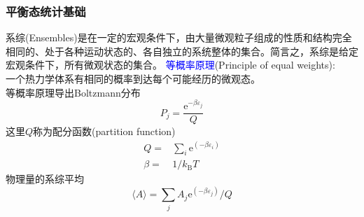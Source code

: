 {\frame
{
	\frametitle{平衡态统计基础}
	系综(\textrm{Ensembles})是在一定的宏观条件下，由大量微观粒子组成的性质和结构完全相同的、处于各种运动状态的、各自独立的系统整体的集合。简言之，系综是给定宏观条件下，所有微观状态的集合。
	\vskip 3pt
	\textcolor{blue}{等概率原理}\textrm{(Principle of equal weights)}:\\
	一个热力学体系有相同的概率到达每个可能经历的微观态。\\
	等概率原理导出\textrm{Boltzmann}分布
	\begin{displaymath}
		P_j=\dfrac{\mathrm{e}^{-\beta\varepsilon_j}}Q
	\end{displaymath}
	这里$Q$称为配分函数\textrm{(partition function)}
	\begin{displaymath}
		\begin{aligned}
			Q=&\sum_i\mathrm{e}^{(-\beta\varepsilon_i)}\\
			\beta=&1/k_{\mathrm{B}}T
		\end{aligned}
	\end{displaymath}
	物理量的系综平均
	\begin{displaymath}
		\langle A\rangle=\sum_jA_j\mathrm{e}^{(-\beta\varepsilon_j)}/Q
	\end{displaymath}
}

}
